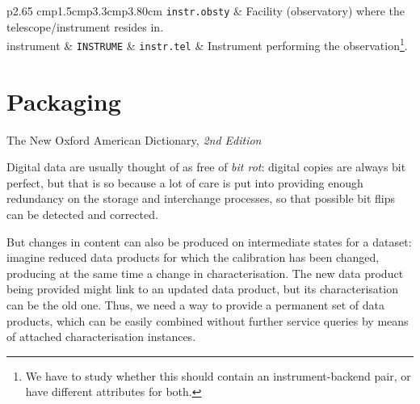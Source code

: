 \begin{table}
\begin{minipage}{\linewidth}
\begin{smallertabular}{p{2.65 cm}p{1.5cm}p{3.3cm}p{3.80cm}}
		        \texttt{instr.obsty} & Facility (observatory) where the
		        telescope/instrument resides in.\\ \addlinespace instrument &
		        \texttt{INSTRUME} & \texttt{instr.tel} & Instrument performing
		        the observation\footnote{We have to study whether this should
		        contain an instrument-backend pair, or have different
		        attributes for both.}.\\ \addlinespace
		\end{smallertabular}
		\label{tabPolicyDataIDMetadata}
		\end{minipage}
		\end{table}
		

	
	\section{Packaging} %
	\label{sec:packaging_the_vopack}
		
		{The New  Oxford American Dictionary, \emph{2nd Edition}}
		
		Digital data are usually thought of as free of \emph{bit
		rot}: digital copies are always bit perfect, but that is
		so because a lot of care is put into providing enough
		redundancy on the storage and interchange processes, so that
		possible bit flips can be detected and corrected.
		
		But changes in content can also be produced on
		intermediate states for a dataset: imagine reduced data
		products for which the calibration has been changed,
		producing at the same time a change in characterisation.
		The new data product being provided might link to an
		updated data product, but its characterisation can be
		the old one. Thus, we need a way to provide a permanent
		set of data products, which can be easily combined without
		further service queries by means of attached
		characterisation instances.
		
